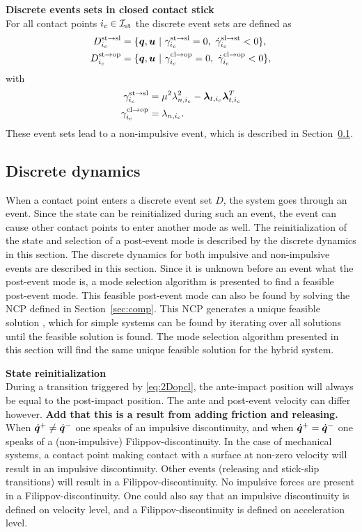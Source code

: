 \documentclass[../DC2017114Bouma.tex]{subfiles}
\begin{document}
\textbf{Discrete events sets in closed contact stick}\\
For all contact points $i_c\in\mathcal{I}_{\text{st}}$ the discrete event sets are defined as
\begin{align}
D^{\text{st}\rightarrow\text{sl}}_{i_c} &= \{ \qb,\ub\ |\ \gamma^{\text{st}\rightarrow\text{sl}}_{i_c} = 0,\ \dot{\gamma}^{\text{sl}\rightarrow\text{st}}_{i_c} < 0\},\label{eq:2Dstsl}\\
D^{\text{st}\rightarrow\text{op}}_{i_c} &= \{ \qb,\ub\ |\ \gamma^{\text{cl}\rightarrow\text{op}}_{i_c} = 0,\ \dot{\gamma}^{\text{cl}\rightarrow\text{op}}_{i_c} < 0\},\label{eq:2Dstop}
\end{align}
with 
\begin{align}
\gamma^{\text{st}\rightarrow\text{sl}}_{i_c} &= \mu^2\lambda_{n,i_c}^2-\boldsymbol{\lambda}_{t,i_c}\boldsymbol{\lambda}_{t,i_c}^T\\
\gamma^{\text{cl}\rightarrow\text{op}}_{i_c} &= \lambda_{n,i_c}.
\end{align}
These event sets lead to a non-impulsive event, which is described in Section~\ref{sec:2discdyn}.

\subsection{Discrete dynamics}\label{sec:2discdyn}
When a contact point enters a discrete event set $D$, the system goes through an event. Since the state can be reinitialized during such an event, the event can cause other contact points to enter another mode as well. The reinitialization of the state and selection of a post-event mode is described by the discrete dynamics in this section. The discrete dynamics for both impulsive and non-impulsive events are described in this section. Since it is unknown before an event what the post-event mode is, a mode selection algorithm is presented to find a feasible post-event mode. This feasible post-event mode can also be found by solving the NCP defined in Section~\ref{sec:comp}. This NCP generates a unique feasible solution \cite{Delassus1917}, which for simple systems can be found by iterating over all solutions until the feasible solution is found. The mode selection algorithm presented in this section will find the same unique feasible solution for the hybrid system.

\textbf{State reinitialization}\\
During a transition triggered by \eqref{eq:2Dopcl}, the ante-impact position will always be equal to the post-impact position. The ante and post-event velocity can differ however. \textbf{Add that this is a result from adding friction and releasing.} When $\dot{{\boldsymbol{q}}}^+\neq\dot{{\boldsymbol{q}}}^-$ one speaks of an impulsive discontinuity, and when $\dot{{\boldsymbol{q}}}^+=\dot{{\boldsymbol{q}}}^-$ one speaks of a (non-impulsive) Filippov-discontinuity. In the case of mechanical systems, a contact point making contact with a surface at non-zero velocity will result in an impulsive discontinuity. Other events (releasing and stick-slip transitions) will result in a Filippov-discontinuity. No impulsive forces are present in a Filippov-discontinuity. One could also say that an impulsive discontinuity is defined on velocity level, and a Filippov-discontinuity is defined on acceleration level.
\end{document}
